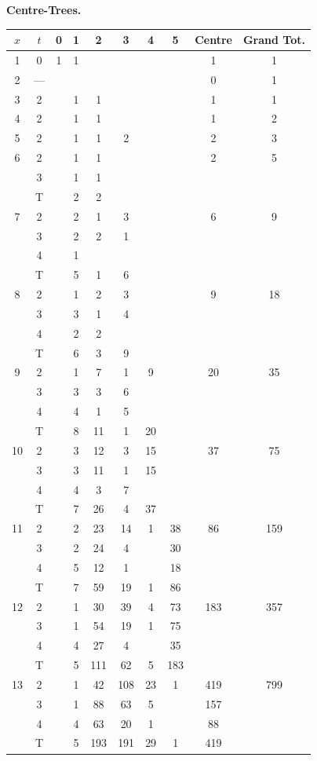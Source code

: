 \documentclass[11pt,a4paper]{book}
\begin{document}
\begin{small}
\noindent\textbf{Centre-Trees.}
\begin{center}
\begin{tabular}{|c|c|cccccc|c|c|}
\hline
$x$ & $t$ & 0 & 1 & 2 & 3 & 4 & 5 & Centre & Grand Tot. \\
\hline
1 & 0 & 1 & 1 & & & & & 1 & 1 \\
\hline
2 & --- & & & & & & & 0 & 1 \\
\hline
3 & 2 & & 1 & 1 & & & & 1 & 1 \\
\hline
4 & 2 & & 1 & 1 & & & & 1 & 2 \\
\hline
5 & 2 & & 1 & 1 & 2 & & & 2 & 3 \\
\hline
6 & 2 & & 1 & 1 & & & & 2 & 5 \\
  & 3 & & 1 & 1 & & & & & \\
  & T & & 2 & 2 & & & & & \\
\hline
7 & 2 & & 2 & 1 & 3 & & & 6 & 9 \\
  & 3 & & 2 & 2 & 1 & & & & \\
  & 4 & & 1 & & & & & & \\
  & T & & 5 & 1 & 6 & & & & \\
\hline
8 & 2 & & 1 & 2 & 3 & & & 9 & 18 \\
  & 3 & & 3 & 1 & 4 & & & & \\
  & 4 & & 2 & 2 & & & & & \\
  & T & & 6 & 3 & 9 & & & & \\
\hline
9 & 2 & & 1 & 7 & 1 & 9 & & 20 & 35 \\
  & 3 & & 3 & 3 & 6 & & & & \\
  & 4 & & 4 & 1 & 5 & & & & \\
  & T & & 8 & 11 & 1 & 20 & & & \\
\hline
10 & 2 & & 3 & 12 & 3 & 15 & & 37 & 75 \\
   & 3 & & 3 & 11 & 1 & 15 & & & \\
   & 4 & & 4 & 3 & 7 & & & & \\
   & T & & 7 & 26 & 4 & 37 & & & \\
\hline
11 & 2 & & 2 & 23 & 14 & 1 & 38 & 86 & 159 \\
   & 3 & & 2 & 24 & 4 & & 30 & & \\
   & 4 & & 5 & 12 & 1 & & 18 & & \\
   & T & & 7 & 59 & 19 & 1 & 86 & & \\
\hline
12 & 2 & & 1 & 30 & 39 & 4 & 73 & 183 & 357 \\
   & 3 & & 1 & 54 & 19 & 1 & 75 & & \\
   & 4 & & 4 & 27 & 4 & & 35 & & \\
   & T & & 5 & 111 & 62 & 5 & 183 & & \\
\hline
13 & 2 & & 1 & 42 & 108 & 23 & 1 & 419 & 799 \\
   & 3 & & 1 & 88 & 63 & 5 & & 157 & \\
   & 4 & & 4 & 63 & 20 & 1 & & 88 & \\
   & T & & 5 & 193 & 191 & 29 & 1 & 419 & \\
\hline
\end{tabular}
\end{center}
\end{small}
\end{document}

